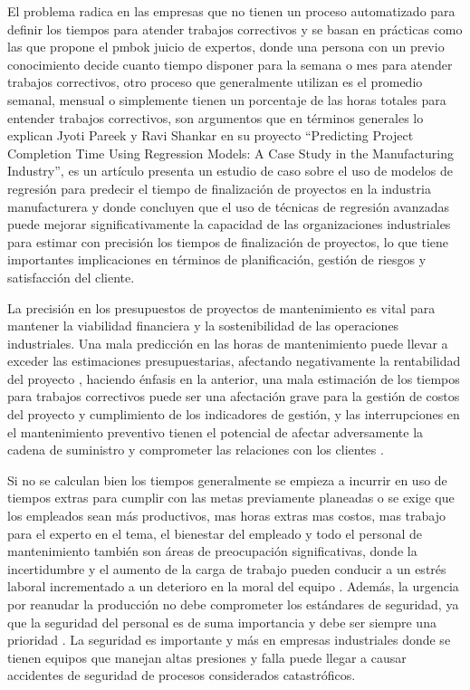 \documentclass[
  11pt,
  bookmarksnumbered]{article}
\begin{document}
El problema radica en las empresas que no tienen un proceso automatizado para definir los tiempos para atender trabajos correctivos y se basan en prácticas como las que propone el pmbok juicio de expertos, donde una persona con un previo conocimiento decide cuanto tiempo disponer para la semana o mes para atender trabajos correctivos, otro proceso que generalmente utilizan es el promedio semanal, mensual o simplemente tienen un porcentaje de las horas totales para entender trabajos correctivos, son argumentos que en términos generales lo explican Jyoti Pareek y Ravi Shankar en su proyecto ``Predicting Project Completion Time Using Regression Models: A Case Study in the Manufacturing Industry'', es un artículo presenta un estudio de caso sobre el uso de modelos de regresión para predecir el tiempo de finalización de proyectos en la industria manufacturera y donde concluyen que el uso de técnicas de regresión avanzadas puede mejorar significativamente la capacidad de las organizaciones industriales para estimar con precisión los tiempos de finalización de proyectos, lo que tiene importantes implicaciones en términos de planificación, gestión de riesgos y satisfacción del cliente.

La precisión en los presupuestos de proyectos de mantenimiento es vital para mantener la viabilidad financiera y la sostenibilidad de las operaciones industriales.
Una mala predicción en las horas de mantenimiento puede llevar a exceder las estimaciones presupuestarias, afectando negativamente la rentabilidad del proyecto \textcite{Wang2017}, haciendo énfasis en la anterior, una mala estimación de los tiempos para trabajos correctivos puede ser una afectación grave para la gestión de costos del proyecto y cumplimiento de los indicadores de gestión, y las interrupciones en el mantenimiento preventivo tienen el potencial de afectar adversamente la cadena de suministro y comprometer las relaciones con los clientes \textcite{Cheng2019}.

Si no se calculan bien los tiempos generalmente se empieza a incurrir en uso de tiempos extras para cumplir con las metas previamente planeadas o se exige que los empleados sean más productivos, mas horas extras mas costos, mas trabajo para el experto en el tema, el bienestar del empleado y todo el personal de mantenimiento también son áreas de preocupación significativas, donde la incertidumbre y el aumento de la carga de trabajo pueden conducir a un estrés laboral incrementado a un deterioro en la moral del equipo \textcite{TaylorSchmidt2020}.
Además, la urgencia por reanudar la producción no debe comprometer los estándares de seguridad, ya que la seguridad del personal es de suma importancia y debe ser siempre una prioridad \textcite{GonzalezMartinez2022}.
La seguridad es importante y más en empresas industriales donde se tienen equipos que manejan altas presiones y falla puede llegar a causar accidentes de seguridad de procesos considerados catastróficos.
\end{document}
